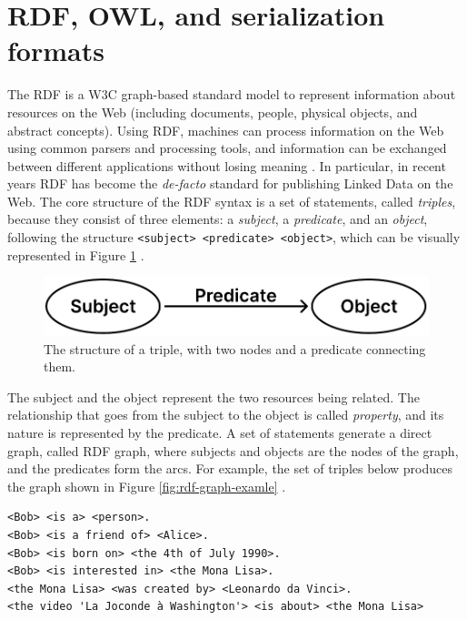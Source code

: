 \section{RDF, OWL, and serialization formats}
\label{sec:rdf-owl-formats}

The \acf{RDF} is a \ac{W3C} graph-based standard model to represent information about resources on the Web (including documents, people, physical objects, and abstract concepts). Using \ac{RDF}, machines can process information on the Web using common parsers and processing tools, and information can be exchanged between different applications without losing meaning \cite{world2014rdfprimer}. In particular, in recent years \ac{RDF} has become the \textit{de-facto} standard for publishing Linked Data on the Web. The core structure of the \ac{RDF} syntax is a set of statements, called \textit{triples}, because they consist of three elements: a \textit{subject}, a \textit{predicate}, and an \textit{object}, following the structure \verb#<subject> <predicate> <object>#, which can be visually represented in Figure \ref{fig:rdf-graph-structure} \cite{world2014rdfconcepts}.

\begin{figure}[!ht]
    \centering
    \includegraphics[width=0.55\columnwidth]{images/rdf/rdf-graph-structure.pdf}
    \caption{The structure of a triple, with two nodes and a predicate connecting them.}
    \label{fig:rdf-graph-structure}
\end{figure}

The subject and the object represent the two resources being related. The relationship that goes from the subject to the object is called \textit{property}, and its nature is represented by the predicate. A set of statements generate a direct graph, called RDF graph, where subjects and objects are the nodes of the graph, and the predicates form the arcs. For example, the set of triples below produces the graph shown in Figure \ref{fig:rdf-graph-examle} \cite{world2014rdfprimer}.

\begin{verbatim}
<Bob> <is a> <person>.
<Bob> <is a friend of> <Alice>.
<Bob> <is born on> <the 4th of July 1990>.
<Bob> <is interested in> <the Mona Lisa>.
<the Mona Lisa> <was created by> <Leonardo da Vinci>.
<the video 'La Joconde à Washington'> <is about> <the Mona Lisa>
\end{verbatim}

